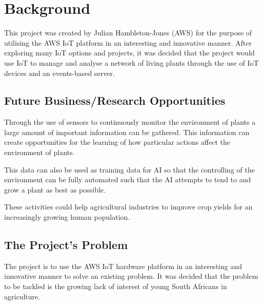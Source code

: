 \documentclass{article}
\begin{document}
\section{Background}
	This project was created by Julian Hambleton-Jones (AWS) for the purpose of utilising the AWS IoT platform in an interesting and innovative manner. After exploring many IoT options and projects, it was decided that the project would use IoT to manage and analyse a network of living plants through the use of IoT devices and an events-based server.
	
\subsection{Future Business/Research Opportunities}
	Through the use of sensors to continuously monitor the environment of plants a large amount of important information can be gathered. This information can create opportunities for the learning of how particular actions affect the environment of plants.
	
	This data can also be used as training data for AI so that the controlling of the environment can be fully automated such that the AI attempts to tend to and grow a plant as best as possible.
	
	These activities could help agricultural industries to improve crop yields for an increasingly growing human population.

\subsection{The Project's Problem}
	The project is to use the AWS IoT hardware platform in an interesting and innovative manner to solve an existing problem. It was decided that the problem to be tackled is the growing lack of interest of young South Africans in agriculture.
	
\end{document}
